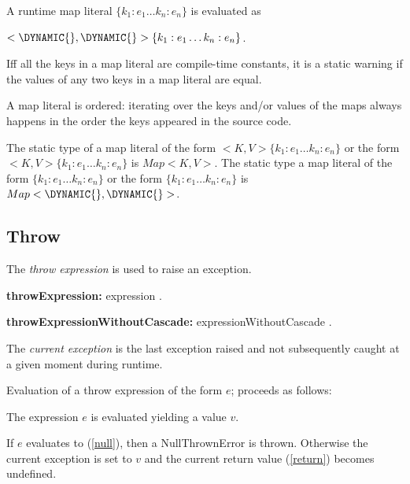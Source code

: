 \documentclass{article}
\newcommand{\code}[1]{{\sf #1}}
\begin{document}
\LMHash{}
A runtime map literal  $\{k_1:e_1\ldots k_n :e_n\}$ is evaluated as  

$<\DYNAMIC{},  \DYNAMIC{}>\{k_1:e_1\ldots k_n :e_n\}$.

\LMHash{}
Iff all the keys in a map literal are compile-time constants, it is a static warning if the values of any two keys in a map literal are equal.

\LMHash{}
A map literal is ordered: iterating over the keys and/or values of the maps always happens in the 
 order the keys appeared in the source code.


\LMHash{}
The static type of a map literal of the form  \CONST{}$ <K, V>\{k_1:e_1\ldots k_n :e_n\}$ or the form $<K, V>\{k_1:e_1\ldots k_n :e_n\}$ is $Map<K, V>$. The static type a map literal of the form  \CONST{}$\{k_1:e_1\ldots k_n :e_n\}$ or the form $\{k_1:e_1\ldots k_n :e_n\}$ is $Map<\DYNAMIC{},  \DYNAMIC{}>$. 


\subsection{Throw}

\LMHash{}
The {\em throw expression}  is used to raise an exception.

 \begin{grammar}
{\bf throwExpression:}
     \THROW{} expression 
    .
    
   {\bf throwExpressionWithoutCascade:}
     \THROW{} expressionWithoutCascade 
    .
 
 \end{grammar}
 
\LMHash{}
 The {\em current exception} is the last exception raised and not subsequently caught at a given moment during runtime. 

\LMHash{}
 Evaluation of a throw expression of the form  \code{\THROW{} $e$;} proceeds as follows:
 
\LMHash{}
The expression $e$ is evaluated yielding a value $v$. 


\LMHash{}
If $e$ evaluates to \NULL{} (\ref{null}), then a \code{NullThrownError} is thrown. Otherwise the current exception is set to $v$ and the current return value (\ref{return}) becomes undefined.
\end{document}
